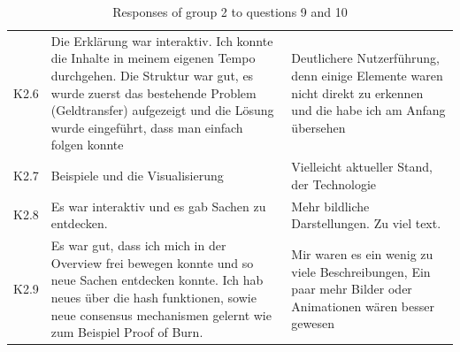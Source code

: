 \begin{table}[H]
\begin{tabularx}{\textwidth}{r|X|X}
         K2.6 & Die Erklärung war interaktiv. Ich konnte die Inhalte in meinem eigenen Tempo durchgehen. Die Struktur war gut, es wurde zuerst das bestehende Problem (Geldtransfer) aufgezeigt und die Lösung wurde eingeführt, dass man einfach folgen konnte & Deutlichere Nutzerführung, denn einige Elemente waren nicht direkt zu erkennen und die habe ich am Anfang übersehen \\
         K2.7 & Beispiele und die Visualisierung & Vielleicht aktueller Stand, der Technologie\\
         K2.8 & Es war interaktiv und es gab Sachen zu entdecken. & Mehr bildliche Darstellungen. Zu viel text. \\
         K2.9 & Es war gut, dass ich mich in der Overview frei bewegen konnte und so neue Sachen entdecken konnte. Ich hab neues über die hash funktionen, sowie neue consensus mechanismen gelernt wie zum Beispiel Proof of Burn. & Mir waren es ein wenig zu viele Beschreibungen, Ein paar mehr Bilder oder Animationen wären besser gewesen\\
    \end{tabularx}
    \caption{Responses of group 2 to questions 9 and 10}
    \label{tab:artefakt9und10}
\end{table}